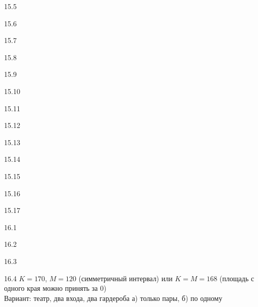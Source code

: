 \protect \hypertarget {soln:15.5}{}
\begin{solution}{{15.5}}
\end{solution}
\protect \hypertarget {soln:15.6}{}
\begin{solution}{{15.6}}
\end{solution}
\protect \hypertarget {soln:15.7}{}
\begin{solution}{{15.7}}
\end{solution}
\protect \hypertarget {soln:15.8}{}
\begin{solution}{{15.8}}
\end{solution}
\protect \hypertarget {soln:15.9}{}
\begin{solution}{{15.9}}
\end{solution}
\protect \hypertarget {soln:15.10}{}
\begin{solution}{{15.10}}
\end{solution}
\protect \hypertarget {soln:15.11}{}
\begin{solution}{{15.11}}
\end{solution}
\protect \hypertarget {soln:15.12}{}
\begin{solution}{{15.12}}
\end{solution}
\protect \hypertarget {soln:15.13}{}
\begin{solution}{{15.13}}
\end{solution}
\protect \hypertarget {soln:15.14}{}
\begin{solution}{{15.14}}
\end{solution}
\protect \hypertarget {soln:15.15}{}
\begin{solution}{{15.15}}
\end{solution}
\protect \hypertarget {soln:15.16}{}
\begin{solution}{{15.16}}
\end{solution}
\protect \hypertarget {soln:15.17}{}
\begin{solution}{{15.17}}
\end{solution}
\protect \hypertarget {soln:16.1}{}
\begin{solution}{{16.1}}
  \autocite{mukherjee2017proof}
\end{solution}
\protect \hypertarget {soln:16.2}{}
\begin{solution}{{16.2}}
\end{solution}
\protect \hypertarget {soln:16.3}{}
\begin{solution}{{16.3}}
\end{solution}
\protect \hypertarget {soln:16.4}{}
\begin{solution}{{16.4}}
  $K=170$, $M=120$ (симметричный интервал) или $K=M=168$ (площадь с одного края можно принять за 0) \\
  Вариант: театр, два входа, два гардероба а) только пары, б) по одному
\end{solution}
